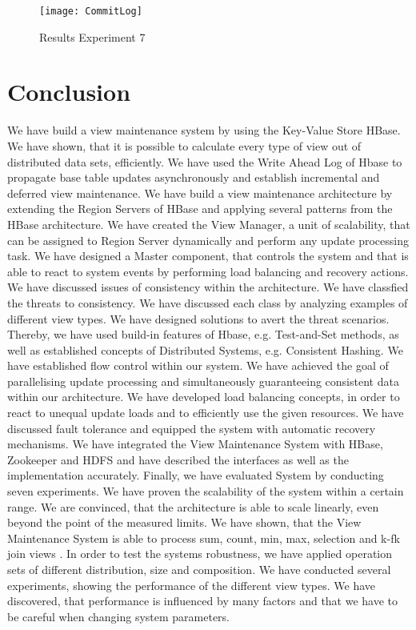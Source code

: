 \documentclass[11pt,a4paper,bibtotoc,idxtotoc,headsepline,footsepline,footexclude,BCOR12mm,DIV13]{scrbook}
\begin{document}
\newpage
\begin{figure}[h!]
    \texttt{[image: CommitLog]}
    \caption{Results Experiment 7}
    \label{fig:commitlog}
\end{figure} 



\chapter{Conclusion}		
\label{chap:conclusion}

We have build a view maintenance system by using the Key-Value Store HBase. We have shown, that it is possible to calculate every type of view out of distributed data sets, efficiently. We have used the Write Ahead Log of Hbase to propagate base table updates asynchronously and establish incremental and deferred view maintenance. We have build a view maintenance architecture by extending the Region Servers of HBase and applying several patterns from the HBase architecture. We have created the View Manager, a unit of scalability, that can be assigned to Region Server dynamically and perform any update processing task. We have designed a Master component, that controls the system and that is able to react to system events by performing load balancing and recovery actions. We have discussed issues of consistency within the architecture. We have classfied the threats to consistency. We have discussed each class by analyzing examples of different view types. We have designed solutions to avert the threat scenarios. Thereby, we have used build-in features of Hbase, e.g. Test-and-Set methods, as well as established concepts of Distributed Systems, e.g. Consistent Hashing. We have established flow control within our system. We have achieved the goal of parallelising update processing and simultaneously guaranteeing consistent data within our architecture. We have developed load balancing concepts, in order to react to unequal update loads and to efficiently use the given resources. We have discussed fault tolerance and equipped the system with automatic recovery mechanisms. 
We have integrated the View Maintenance System with HBase, Zookeeper and HDFS and have described the interfaces as well as the implementation accurately.  Finally, we have evaluated System by conducting seven experiments. We have proven the scalability of the system within a certain range. We are convinced, that the architecture is able to scale linearly, even beyond the point of the measured limits. We have shown, that the View Maintenance System is able to process sum, count, min, max, selection and k-fk join views . In order to test the systems robustness, we have applied operation sets of different distribution, size and composition. We have conducted several experiments, showing the performance of the different view types. We have discovered, that performance is influenced by many factors and that we have to be careful when changing system parameters. 
\end{document}
